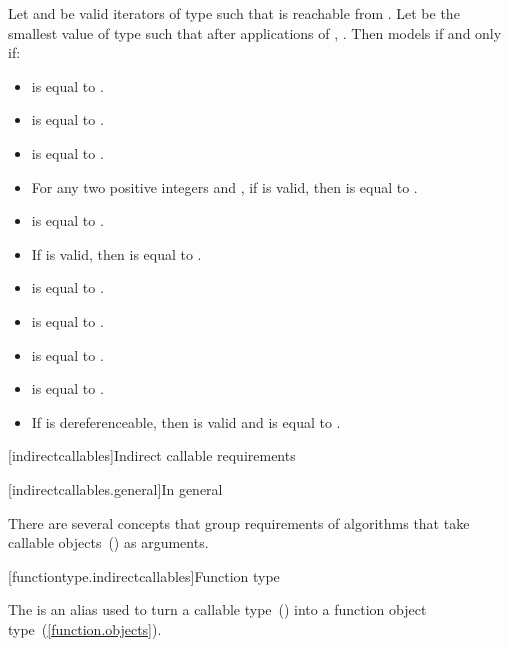 \begin{addedblock}
\pnum
Let  and  be valid iterators of type  such that  is reachable
from . Let  be the smallest value of type  such that after
 applications of , . Then  models
 if and only if:

\begin{itemize}
\item {} is equal to .
\item {} is equal to .
\item {} is equal to .
\item For any two positive integers  and , if  is valid, then
 is equal to .
\item {} is equal to .
\item If  is valid, then  is equal to .
\item {} is equal to .
\item {} is equal to .
\item {} is equal to .
\item {} is equal to .
\item If  is dereferenceable, then  is valid and is equal to .
\end{itemize}

[indirectcallables]{Indirect callable requirements}

[indirectcallables.general]{In general}

\pnum
There are several concepts that group requirements of algorithms that take callable
objects~() as arguments.


[functiontype.indirectcallables]{Function type}

\pnum
The  is an alias used to turn a callable type~() into a function
object type~(\ref{function.objects}).


\end{addedblock}

